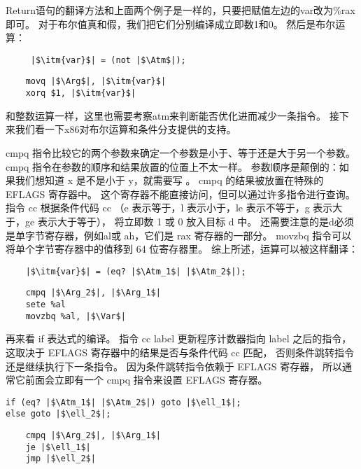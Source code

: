 Return语句的翻译方法和上面两个例子是一样的，只要把赋值左边的var改为\%rax即可。
对于布尔值真和假，我们把它们分别编译成立即数1和0。
然后是布尔运算：
\begin{transformation}
\begin{lstlisting}
     |$\itm{var}$| = (not |$\Atm$|);
\end{lstlisting}
\compilesto
\begin{lstlisting}
    movq |$\Arg$|, |$\itm{var}$|
    xorq $1, |$\itm{var}$|
\end{lstlisting}
\end{transformation}
和整数运算一样，这里也需要考察atm来判断能否优化进而减少一条指令。
接下来我们看一下x86对布尔运算和条件分支提供的支持。

cmpq 指令比较它的两个参数来确定一个参数是小于、等于还是大于另一个参数。
cmpq 指令在参数的顺序和结果放置的位置上不太一样。
参数顺序是颠倒的：如果我们想知道 x 是不是小于 y，就需要写 。
cmpq 的结果被放置在特殊的 EFLAGS 寄存器中。
这个寄存器不能直接访问，但可以通过许多指令进行查询。
指令 cc  根据条件代码 cc
（e 表示等于，l 表示小于，le 表示不等于，g 表示大于，ge 表示大于等于），
将立即数 1 或 0 放入目标 d 中。
还需要注意的是d必须是单字节寄存器，例如al或 ah，它们是 rax 寄存器的一部分。
movzbq 指令可以将单个字节寄存器中的值移到 64 位寄存器里。
综上所述，运算可以被这样翻译：
\begin{transformation}
\begin{lstlisting}
    |$\itm{var}$| = (eq? |$\Atm_1$| |$\Atm_2$|);
\end{lstlisting}
\compilesto
\begin{lstlisting}
    cmpq |$\Arg_2$|, |$\Arg_1$|
    sete %al
    movzbq %al, |$\Var$|
\end{lstlisting}
\end{transformation}

再来看 if 表达式的编译。
指令 cc label 更新程序计数器指向 label 之后的指令，
这取决于 EFLAGS 寄存器中的结果是否与条件代码 cc 匹配，
否则条件跳转指令还是继续执行下一条指令。
因为条件跳转指令依赖于 EFLAGS 寄存器，
所以通常它前面会立即有一个 cmpq 指令来设置 EFLAGS 寄存器。

\begin{transformation}
\begin{lstlisting}
if (eq? |$\Atm_1$| |$\Atm_2$|) goto |$\ell_1$|;
else goto |$\ell_2$|;
\end{lstlisting}
\compilesto
\begin{lstlisting}
    cmpq |$\Arg_2$|, |$\Arg_1$|
    je |$\ell_1$|
    jmp |$\ell_2$|
\end{lstlisting}
\end{transformation}

